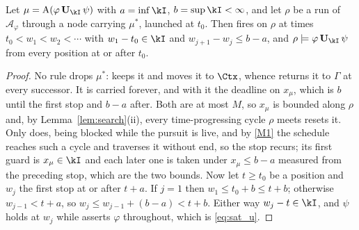 \begin{lemma}[Recurrence]\label{lem:recurrence}
Let $\mu=\mathrm{A}(\varphi\,\mathbf{U}_\kI\,\psi)$ with $a=\inf\kI$, $b=\sup\kI<\infty$, and let
$\rho$ be a run of $\mathcal A_\varphi$ through a node carrying $\mu^{\ast}$, launched at $t_0$. Then
 fires on $\rho$ at times $t_0<w_1<w_2<\cdots$ with $w_1-t_0\in\kI$ and
$w_{j+1}-w_j\le b-a$, and $\rho\models\varphi\,\mathbf{U}_\kI\,\psi$ from every position at or after
$t_0$.
\end{lemma}
\begin{proof}
No rule drops $\mu^{\ast}$:  keeps it and  moves it to $\Ctx$, whence
 returns it to $\Gamma$ at every successor. It is carried forever, and with it the
deadline on $x_\mu$, which is $b$ until the first stop and $b-a$ after. Both are at most $M$, so
$x_\mu$ is bounded along $\rho$ and, by Lemma~\ref{lem:search}(ii), every time-progressing cycle
$\rho$ meets resets it. Only  does,  being blocked while the pursuit
is live, and by \ref{M1} the schedule reaches such a cycle and traverses it without end, so the stop
recurs; its first guard is $x_\mu\in\kI$ and each later one is taken under $x_\mu\le b-a$ measured
from the preceding stop, which are the two bounds. Now let $t\ge t_0$ be a position and
$w_j$ the first stop at or after $t+a$. If $j=1$ then $w_1\le t_0+b\le t+b$; otherwise $w_{j-1}<t+a$,
so $w_j\le w_{j-1}+(b-a)<t+b$. Either way $w_j-t\in\kI$, and $\psi$ holds at $w_j$ while
 asserts $\varphi$ throughout, which is \eqref{eq:sat_u}.
\end{proof}

